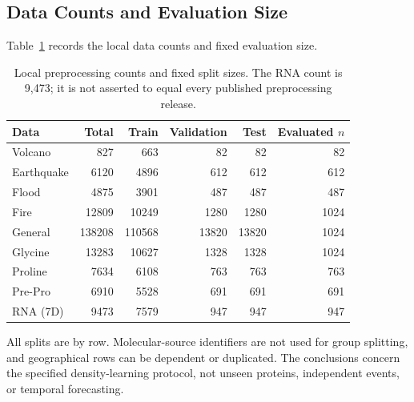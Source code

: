 \subsection{Data Counts and Evaluation Size}
Table~\ref{tab:counts} records the local data counts and fixed evaluation size.
\begin{table}[t]\caption{Local preprocessing counts and fixed split sizes. The RNA count is 9,473; it is not asserted to equal every published preprocessing release.}\label{tab:counts}\centering\small\begin{tabular}{@{}lrrrrr@{}}\toprule
Data & Total & Train & Validation & Test & Evaluated $n$ \\
\midrule
Volcano & 827 & 663 & 82 & 82 & 82 \\
Earthquake & 6120 & 4896 & 612 & 612 & 612 \\
Flood & 4875 & 3901 & 487 & 487 & 487 \\
Fire & 12809 & 10249 & 1280 & 1280 & 1024 \\
General & 138208 & 110568 & 13820 & 13820 & 1024 \\
Glycine & 13283 & 10627 & 1328 & 1328 & 1024 \\
Proline & 7634 & 6108 & 763 & 763 & 763 \\
Pre-Pro & 6910 & 5528 & 691 & 691 & 691 \\
RNA (7D) & 9473 & 7579 & 947 & 947 & 947 \\
\bottomrule\end{tabular}\end{table}
All splits are by row. Molecular-source identifiers are not used for group splitting, and geographical rows can be dependent or duplicated. The conclusions concern the specified density-learning protocol, not unseen proteins, independent events, or temporal forecasting.
